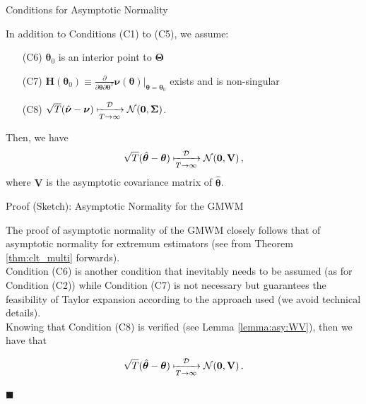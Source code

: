 \documentclass[envcountsect,usenames,dvipsnames]{beamer}
\theoremstyle{mystyle}
\begin{document}
\begin{frame}{Conditions for Asymptotic Normality}

\begin{Theorem}
In addition to Conditions {\color{blue}(C1)} to {\color{blue}(C5)}, we assume:
  \begin{itemize}
    \item[(C6)] $\bm{\theta}_0$ is an interior point to $\bm{\Theta}$
    \item[(C7)] $\mathbf{H}(\bm{\theta}_0) \equiv \frac{\partial}{\partial \bm{\theta} \partial \bm{\theta}^T} \bm{\nu}(\bm{\theta})\big|_{\bm{\theta}=\bm{\theta}_0}$ exists and is non-singular
    \item[(C8)] $\sqrt{T} (\hat{\bm{\nu}} - \bm{\nu}) \xmapsto[T\rightarrow\infty]{\mathcal{D}} \mathcal{N}(\mathbf{0},\bm{\Sigma})$.
  \end{itemize} 
  Then, we have
\begin{equation*}
    \sqrt{T}(\hat{\bm{\theta}} - \bm{\theta}) \xmapsto[T\rightarrow\infty]{\mathcal{D}} \mathcal{N}(\mathbf{0},\mathbf{V}) \,,
\end{equation*}
where $\mathbf{V}$ is the asymptotic covariance matrix of $\hat{\bm{\theta}}$. 
\end{Theorem}

\end{frame}

\begin{frame}{Proof (Sketch): Asymptotic Normality for the GMWM}
    
The proof of asymptotic normality of the GMWM closely follows that of asymptotic normality for extremum estimators (see from Theorem \ref{thm:clt_multi} forwards).\\[0.2cm]

Condition (C6) is another condition that inevitably needs to be assumed (as for Condition (C2)) while Condition (C7) is not necessary but guarantees the feasibility of Taylor expansion according to the approach used (we avoid technical details).\\[0.2cm]

Knowing that Condition (C8) is verified (see Lemma \ref{lemma:asy:WV}), then we have that

\begin{equation*}
    \sqrt{T}(\hat{\bm{\theta}} - \bm{\theta}) \xmapsto[T\rightarrow\infty]{\mathcal{D}} \mathcal{N}(\mathbf{0},\mathbf{V}) \,.
\end{equation*}

\hfill $\blacksquare$

\end{frame}
\end{document}
